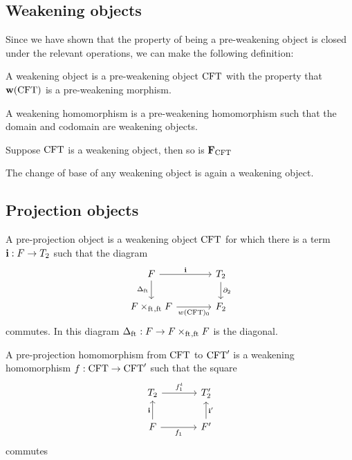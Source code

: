 \subsection{Weakening objects}
Since we have shown that the property of being a pre-weakening object is closed
under the relevant operations, we can make the following definition:

\begin{defn}
A weakening object is a pre-weakening object $\mathrm{CFT}$ with the property that
$\mathbf{w}(\mathrm{CFT})$ is a pre-weakening morphism.
\end{defn}

\begin{defn}
A weakening homomorphism is a pre-weakening homomorphism such that the domain
and codomain are weakening objects.
\end{defn}

\begin{thm}
Suppose $\mathrm{CFT}$ is a weakening object, then so is $\mathbf{F}_{\mathrm{CFT}}$
\end{thm}

\begin{thm}
The change of base of any weakening object is again a weakening object.
\end{thm}

\subsection{Projection objects}
\begin{defn}
A pre-projection object is a weakening object $\mathrm{CFT}$ for which there is a term
$\mathbf{i}:F\to T_2$ such that the diagram
\begin{equation*}
\begin{tikzcd}[column sep=large]
\stesysf \ar{r}{\mathbf{i}} \ar{d}[swap]{\Delta_{\eft}} & \stesyst_2 \ar{d}{\ebd[2]}\\
\pullback{\stesysf}{\stesysf}{\eft}{\eft} \ar{r}[swap]{w(\stesys)_0} & \stesysf_2
\end{tikzcd}
\end{equation*}
commutes. In this diagram $\Delta_{\eft}:\stesysf\to \pullback{\stesysf}{\stesysf}{\eft}{\eft}$ is the diagonal.
\end{defn}

\begin{defn}
A pre-projection homomorphism from $\mathrm{CFT}$ to $\mathrm{CFT}'$ is a weakening homomorphism
$f:\mathrm{CFT}\to \mathrm{CFT}'$ such that the square
\begin{equation*}
\begin{tikzcd}[column sep=large]
\stesyst_2
  \ar{r}{f^t_1}
  &
\stesyst_2'
  \\
\stesysf \ar{r}[swap]{f_1}
  \ar{u}{\mathbf{i}}
  &
\stesysf'
  \ar{u}[swap]{\mathbf{i}'}
\end{tikzcd}
\end{equation*}
commutes
\end{defn}

